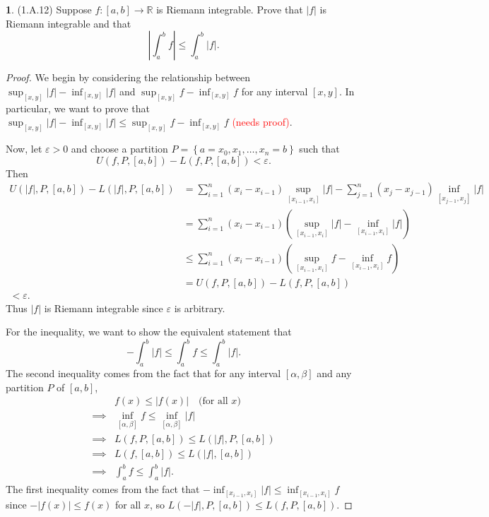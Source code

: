 \documentclass[12pt]{article}
\theoremstyle{definition}
\newtheorem{ex}{}
\begin{document}
\begin{ex}
	(1.A.12)
	Suppose $f: [a, b] \to \mathbb{R}$ is Riemann integrable.
	Prove that $|f|$ is Riemann integrable and that \begin{equation*}
		\left| \int_a^b f \right| \leq \int_a^b |f|.
	\end{equation*}
\end{ex}
\begin{proof}
	We begin by considering the relationship between $\sup_{[x, y]}|f| - \inf_{[x, y]} |f|$ and $\sup_{[x,y]}f - \inf_{[x,y]} f$ for any interval $[x,y]$.
	In particular, we want to prove that $\sup_{[x,y]}|f| - \inf_{[x,y]}|f| \leq \sup_{[x,y]}f - \inf_{[x,y]}f$ \textcolor{red}{(needs proof)}.

	Now, let $\varepsilon > 0$ and choose a partition $P = \left\lbrace a = x_0, x_1, \dots, x_n = b \right\rbrace$ such that \begin{equation*}
		U(f, P, [a, b]) - L(f,P,[a,b]) < \varepsilon.
	\end{equation*}
	Then \begin{align*}
		U(|f|, P, [a, b]) - L(|f|, P, [a,b]) & = \sum_{i=1}^n(x_i-x_{i-1}) \sup_{[x_{i-1},x_i]}|f| - \sum_{j=1}^n(x_j-x_{j-1})\inf_{[x_{j-1},x_j]}|f| \\
		                                     & = \sum_{i=1}^n(x_i - x_{i-1}) \left( \sup_{[x_{i-1},x_i]}|f| - \inf_{[x_{i-1},x_i]} |f| \right)        \\
		                                     & \leq \sum_{i=1}^n(x_i - x_{i-1}) \left( \sup_{[x_{i-1},x_i]}f - \inf_{[x_{i-1},x_i]} f \right)         \\
		                                     & = U(f, P, [a, b]) - L(f, P, [a,b])                                                                     \\
		< \varepsilon.
	\end{align*}
	Thus $|f|$ is Riemann integrable since $\varepsilon$ is arbitrary.

	For the inequality, we want to show the equivalent statement that \begin{equation*}
		-\int_a^b |f| \leq \int_a^b f \leq \int_a^b |f|.
	\end{equation*}
	The second inequality comes from the fact that for any interval $[\alpha, \beta]$ and any partition $P$ of $[a,b]$, \begin{align*}
		         & f(x) \leq |f(x)| \quad \text{(for all $x$)}              \\
		\implies & \inf_{[\alpha, \beta]} f \leq \inf_{[\alpha, \beta]} |f| \\
		\implies & L(f, P, [a, b]) \leq L(|f|, P, [a,b])                    \\
		\implies & L(f, [a,b]) \leq L(|f|, [a,b])                           \\
		\implies & \int_a^b f \leq \int_a^b |f|.
	\end{align*}
  The first inequality comes from the fact that $-\inf_{[x_{i-1}, x_i]} |f| \leq \inf_{[x_{i-1},x_i]} f$ since $-|f(x)| \leq f(x)$ for all $x$, so $L(-|f|, P, [a, b]) \leq L(f, P, [a, b])$.
\end{proof}
\end{document}
